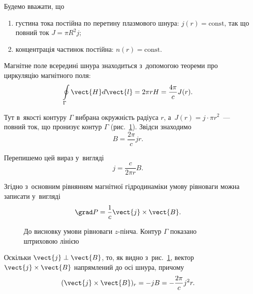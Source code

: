 Будемо вважати, що
\begin{enumerate}
	\item густина тока постійна по перетину плазмового шнура: $j(r) = \text{const}$, так що повний ток $J = \pi R^2 j$;
	\item концентрація частинок постійна: $n(r) = \text{const}$.
\end{enumerate}

Магнітне поле всередині шнура знаходиться з~допомогою теореми про циркуляцію магнітного поля:
\begin{equation*}
	\oint\limits_{\Gamma} \vect{H} d\vect{l} = 2\pi r H = \frac{4\pi}{c}J(r).
\end{equation*}

Тут в~якості контуру $\Gamma$ вибрана окружність радіуса $r$, а~$J(r) = j\cdot\pi r^2$~--- повний ток, що пронизує контур $\Gamma$ (рис.~\ref{pic:z-pinch-equilibrium}). Звідси знаходимо
\begin{equation*}
	B = \frac{2\pi}{c}jr.
\end{equation*}

Перепишемо цей вираз у~вигляді
\begin{equation*}
	j = \frac{c}{2\pi r}B.
\end{equation*}

Згідно з~основним рівнянням магнітної гідродинаміки умову рівноваги можна записати у~вигляді
\begin{equation*}
	\grad P = \frac{1}{c}\vect{j}\times\vect{B}.
\end{equation*}

\begin{figure}[h!]\centering
	\caption{До висновку умови рівноваги $z$-пінча. Контур $\Gamma$ показано штриховою лінією}
	\label{pic:z-pinch-equilibrium}
\end{figure}

Оскільки $\vect{j} \perp \vect{B}$, то, як видно з~рис.~\ref{pic:z-pinch-equilibrium}, вектор $\vect{j}\times\vect{B}$ напрямлений до осі шнура, причому
\begin{equation*}
	(\vect{j}\times\vect{B})_r = -jB = -\frac{2\pi}{c}j^2r.
\end{equation*}

